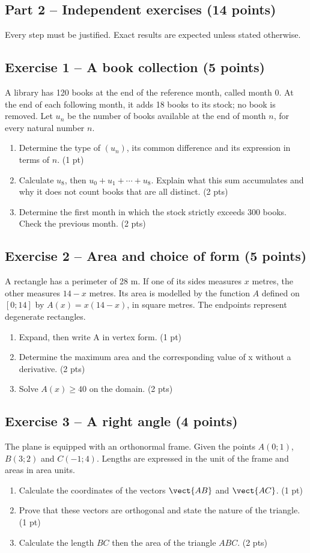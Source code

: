 \clearpage\subsection*{Part 2 -- Independent exercises (14 points)}
Every step must be justified. Exact results are expected unless stated otherwise.
\subsection*{Exercise 1 -- A book collection (5 points)}
A library has 120 books at the end of the reference month, called month 0. At the end of each following month, it adds 18 books to its stock; no book is removed. Let $u_n$ be the number of books available at the end of month $n$, for every natural number $n$.
\begin{enumerate}
\item Determine the type of $(u_n)$, its common difference and its expression in terms of $n$. \hfill(1 pt)
\item Calculate $u_8$, then $u_0+u_1+\cdots+u_8$. Explain what this sum accumulates and why it does not count books that are all distinct. \hfill(2 pts)
\item Determine the first month in which the stock strictly exceeds 300 books. Check the previous month. \hfill(2 pts)
\end{enumerate}
\subsection*{Exercise 2 -- Area and choice of form (5 points)}
A rectangle has a perimeter of 28 m. If one of its sides measures $x$ metres, the other measures $14-x$ metres. Its area is modelled by the function $A$ defined on $[0;14]$ by $A(x)=x(14-x)$, in square metres. The endpoints represent degenerate rectangles.
\begin{enumerate}
\item Expand, then write A in vertex form. \hfill(1 pt)
\item Determine the maximum area and the corresponding value of x without a derivative. \hfill(2 pts)
\item Solve $A(x)\geq40$ on the domain. \hfill(2 pts)
\end{enumerate}
\subsection*{Exercise 3 -- A right angle (4 points)}
The plane is equipped with an orthonormal frame. Given the points $A(0;1)$, $B(3;2)$ and $C(-1;4)$. Lengths are expressed in the unit of the frame and areas in area units.
\begin{enumerate}
\item Calculate the coordinates of the vectors $\vect{AB}$ and $\vect{AC}$. \hfill(1 pt)
\item Prove that these vectors are orthogonal and state the nature of the triangle. \hfill(1 pt)
\item Calculate the length $BC$ then the area of the triangle $ABC$. \hfill(2 pts)
\end{enumerate}
